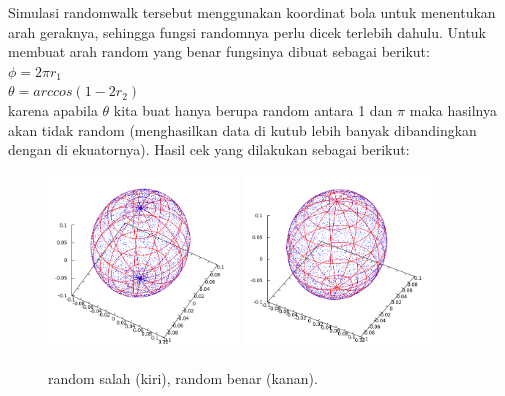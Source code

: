 \documentclass[paper=a4, fontsize=11pt]{scrartcl}
\numberwithin{equation}{section} %
\numberwithin{figure}{section} %
\numberwithin{table}{section} %
\begin{document}
Simulasi randomwalk tersebut menggunakan koordinat bola untuk menentukan arah geraknya, sehingga fungsi randomnya perlu dicek terlebih dahulu. Untuk membuat arah random yang benar fungsinya dibuat sebagai berikut:\\
$ \phi = 2 \pi r_{1}$\\
$\theta = arccos(1 - 2 r_{2} )$\\
karena apabila $\theta$ kita buat hanya berupa random antara 1 dan $\pi$ maka hasilnya akan tidak random (menghasilkan data di kutub lebih banyak dibandingkan dengan di ekuatornya). Hasil cek yang dilakukan sebagai berikut:
\begin{figure}
	\centering
	\includegraphics[width=0.45\textwidth]{distribusibola-salah.png}
	\includegraphics[width=0.45\textwidth]{distribusibola-benar.png}
	\caption{random salah (kiri), random benar (kanan).}
\end{figure}
\end{document}
